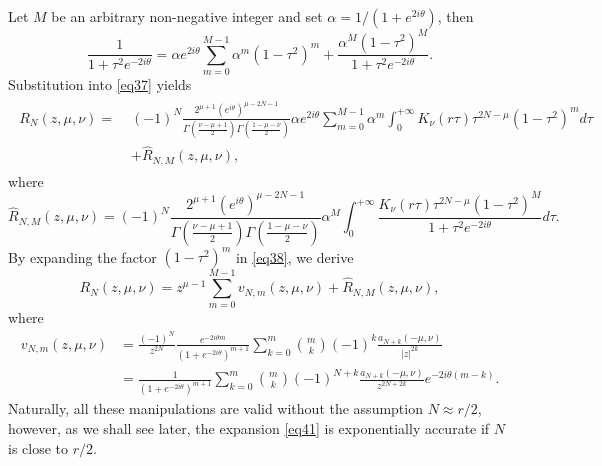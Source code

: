 \documentclass[a4paper,twoside,10pt]{amsart}
\numberwithin{equation}{section}
\begin{document}
Let $M$ be an arbitrary non-negative integer and set $\alpha = 1/\left(1 + e^{2i\theta }\right)$, then
\[
\frac{1}{{1 + \tau ^2 e^{ - 2i\theta } }} = \alpha e^{2i\theta } \sum\limits_{m = 0}^{M - 1} {\alpha ^m \left( {1 - \tau ^2 } \right)^m }  + \frac{{\alpha ^M \left( {1 - \tau ^2 } \right)^M }}{{1 + \tau ^2 e^{ - 2i\theta } }}.
\]
Substitution into \eqref{eq37} yields
\begin{gather}\label{eq38}
\begin{split}
R_N \left( {z,\mu ,\nu } \right) = \; & \left( { - 1} \right)^N \frac{{2^{\mu  + 1} \left( {e^{i\theta } } \right)^{\mu  - 2N - 1} }}{{\Gamma \left( {\frac{{\nu  - \mu  + 1}}{2}} \right)\Gamma \left( {\frac{{1 - \mu  - \nu }}{2}} \right)}}\alpha e^{2i\theta } \sum\limits_{m = 0}^{M - 1} {\alpha ^m \int_0^{ + \infty } {K_\nu  \left( {r\tau } \right)\tau ^{2N - \mu } \left( {1 - \tau ^2 } \right)^m d\tau } } \\ & + \widehat R_{N,M} \left( {z,\mu ,\nu } \right),
\end{split}
\end{gather}
where
\begin{equation}\label{eq39}
\widehat R_{N,M} \left( {z,\mu ,\nu } \right) = \left( { - 1} \right)^N \frac{{2^{\mu  + 1} \left( {e^{i\theta } } \right)^{\mu  - 2N - 1}}}{{\Gamma \left( {\frac{{\nu  - \mu  + 1}}{2}} \right)\Gamma \left( {\frac{{1 - \mu  - \nu }}{2}} \right)}}\alpha ^M \int_0^{ + \infty } {\frac{{K_\nu  \left( {r\tau } \right)\tau ^{2N - \mu } \left( {1 - \tau ^2 } \right)^M }}{{1 + \tau ^2 e^{ - 2i\theta } }}d\tau } .
\end{equation}
By expanding the factor $\left(1-\tau^2\right)^m$ in \eqref{eq38}, we derive
\begin{equation}\label{eq41}
R_{N} \left( {z,\mu ,\nu } \right) =z^{\mu - 1} \sum\limits_{m = 0}^{M - 1} {v_{N,m} \left( {z,\mu ,\nu } \right)}  + \widehat R_{N,M} \left( {z,\mu ,\nu } \right),
\end{equation}
where
\begin{align*}
v_{N,m} \left( {z,\mu ,\nu } \right) & = \frac{\left( { - 1} \right)^N}{z^{2N}} \frac{{e^{ - 2i\theta m} }}{{\left( {1 + e^{ - 2i\theta } } \right)^{m + 1} }}\sum\limits_{k = 0}^m {\binom{m}{k}\left( { - 1} \right)^k \frac{{a_{N + k} \left( { - \mu ,\nu } \right)}}{{\left| z \right|^{2k} }}}
\\ & = \frac{1}{{\left( {1 + e^{ - 2i\theta } } \right)^{m + 1} }}\sum\limits_{k = 0}^m {\binom{m}{k}\left( { - 1} \right)^{N + k} \frac{{a_{N + k} \left( { - \mu ,\nu } \right)}}{{z^{2N + 2k} }}e^{ - 2i\theta \left( {m - k} \right)} } .
\end{align*}
Naturally, all these manipulations are valid without the assumption $N \approx r/2$, however, as we shall see later, the expansion \eqref{eq41} is exponentially accurate if $N$ is close to $r/2$.
\end{document}
